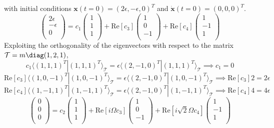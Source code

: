 \documentclass[a4paper]{article}
\begin{document}
\begin{ans}
\begin{enumerate}[label=(\alph*)]
with initial conditions $\mathbf{x}(t=0)=(2\epsilon,-\epsilon,0)^T$ and $\mathbf{\dot{x}}(t=0)=(0,0,0)^T$.
$$\begin{pmatrix}2\epsilon\\-\epsilon\\0\\\end{pmatrix}=c_1\begin{pmatrix}1\\1\\1\\\end{pmatrix}+\text{Re}[c_3]\begin{pmatrix}1\\0\\-1\\\end{pmatrix}+\text{Re}[c_4]\begin{pmatrix}1\\-1\\1\\\end{pmatrix}$$
Exploiting the orthogonality of the eigenvectors with respect to the matrix $\mathcal{T}=m\diag(1,2,1)$,
$$c_1\langle(1,1,1)^T|(1,1,1)^T\rangle_{\mathcal{T}}=\epsilon\langle (2,-1,0)^T|(1,1,1)^T\rangle_{\mathcal{T}}\implies c_1=0$$
$$\text{Re}[c_3]\langle(1,0,-1)^T|(1,0,-1)^T\rangle_{\mathcal{T}}=\epsilon\langle (2,-1,0)^T|(1,0,-1)^T\rangle_{\mathcal{T}}\implies \text{Re}[c_3]2=2\epsilon$$
$$\text{Re}[c_4]\langle(1,-1,1)^T|(1,-1,1)^T\rangle_{\mathcal{T}}=\epsilon\langle (2,-1,0)^T|(1,-1,1)^T\rangle_{\mathcal{T}}\implies \text{Re}[c_4]4=4\epsilon$$
$$\begin{pmatrix}0\\0\\0\\\end{pmatrix}=c_2\begin{pmatrix}1\\1\\1\\\end{pmatrix}+\text{Re}[i\Omega c_3]\begin{pmatrix}1\\0\\-1\\\end{pmatrix}+\text{Re}[i\sqrt{2}\Omega c_4]\begin{pmatrix}1\\-1\\1\\\end{pmatrix}$$

\end{enumerate}
\end{ans}
\end{document}
